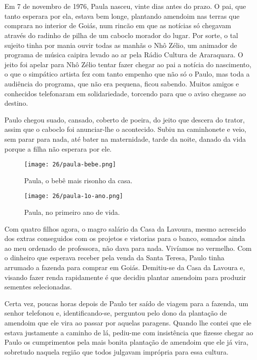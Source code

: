 \chapter{}

Em 7 de novembro de 1976, Paula nasceu, vinte dias antes do prazo.
O pai, que tanto esperara por ela, estava bem longe, plantando amendoim nas terras que comprara no interior de Goiás, num rincão em que as notícias só chegavam através do radinho de pilha de um caboclo morador do lugar.
Por sorte, o tal sujeito tinha por mania ouvir todas as manhãs o Nhô Zélio, um animador de programa de música caipira levado ao ar pela Rádio Cultura de Araraquara.
O jeito foi apelar para Nhô Zélio tentar fazer chegar ao pai a notícia do nascimento, o que o simpático artista fez com tanto empenho que não só o Paulo, mas toda a audiência do programa, que não era pequena, ficou sabendo.
Muitos amigos e conhecidos telefonaram em solidariedade, torcendo para que o aviso chegasse ao destino.

Paulo chegou suado, cansado, coberto de poeira, do jeito que descera do trator, assim que o caboclo foi anunciar-lhe o acontecido.
Subiu na caminhonete e veio, sem parar para nada, até bater na maternidade, tarde da noite, danado da vida porque a filha não esperara por ele.


\begin{figure}
\centering
\texttt{[image: 26/paula-bebe.png]}
\caption{Paula, o bebê mais risonho da casa.}
\end{figure}


\begin{figure}
\centering
\texttt{[image: 26/paula-1o-ano.png]}
\caption{Paula, no primeiro ano de vida.}
\end{figure}

Com quatro filhos agora, o magro salário da Casa da Lavoura, mesmo acrescido dos extras conseguidos com os projetos e vistorias para o banco, somados ainda ao meu ordenado de professora, não dava para nada.
Vivíamos no vermelho.
Com o dinheiro que esperava receber pela venda da Santa Teresa, Paulo tinha arrumado a fazenda para comprar em Goiás.
Demitiu-se da Casa da Lavoura e, visando fazer renda rapidamente é que decidiu plantar amendoim para produzir sementes selecionadas.

Certa vez, poucas horas depois de Paulo ter saído de viagem para a fazenda, um senhor telefonou e, identificando-se, perguntou pelo dono da plantação de amendoim que ele vira ao passar por aquelas paragens.
Quando lhe contei que ele estava justamente a caminho de lá, pediu-me com insistência que fizesse chegar ao Paulo os cumprimentos pela mais bonita plantação de amendoim que ele já vira, sobretudo naquela região que todos julgavam imprópria para essa cultura.

